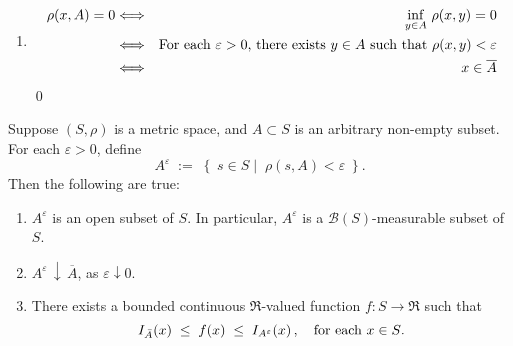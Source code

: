 \begin{enumerate}
\item
	\begin{eqnarray*}
	\rho(x,A) = 0
	&\Longleftrightarrow& \inf_{y\in A}\,\rho(x,y) = 0
	\\
	&\Longleftrightarrow& \textnormal{For each $\varepsilon > 0$, there exists $y \in A$ such that $\rho(x,y) < \varepsilon$}
	\\
	&\Longleftrightarrow& x \in \overline{A}
	\end{eqnarray*}
\qed
\end{enumerate}

\begin{lemma}
\label{LemmaAEpsilon}
\quad
Suppose $\left(S,\rho\right)$ is a metric space, and $A \subset S$ is an arbitrary non-empty subset.
For each $\varepsilon > 0$, define
\begin{equation*}
A^{\varepsilon} \;:=\;
\left\{\;
s \in S
\;\left\vert\;\;
\rho(s,A) < \varepsilon
\right.
\;\right\}.
\end{equation*}
Then the following are true:
\begin{enumerate}
\item
	$A^{\varepsilon}$ is an open subset of $S$. In particular, $A^{\varepsilon}$ is a $\mathcal{B}(S)$-measurable subset of $S$.
\item
	$A^{\varepsilon}\,\downarrow\,\overline{A}$, as $\varepsilon \downarrow 0$.
\item
	There exists a bounded continuous $\Re$-valued function $f : S \longrightarrow \Re$
	such that
	\begin{equation*}
	I_{\bar{A}}(x) \;\leq\; f(x) \;\leq\; I_{A^{\varepsilon}}(x)\,,
	\quad\textnormal{for each $x \in S$}.
	\end{equation*}
\end{enumerate}	
\end{lemma}
\proof
